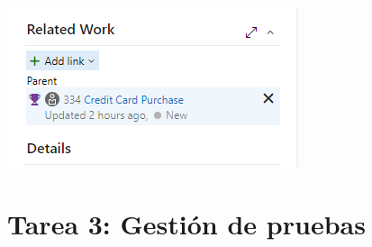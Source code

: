 \begin{itemize}
\begin{center}
\includegraphics[width=\columnwidth]{images/7}\newline
\end{center}
\end{itemize}
\section{Tarea 3: Gestión de pruebas} 

